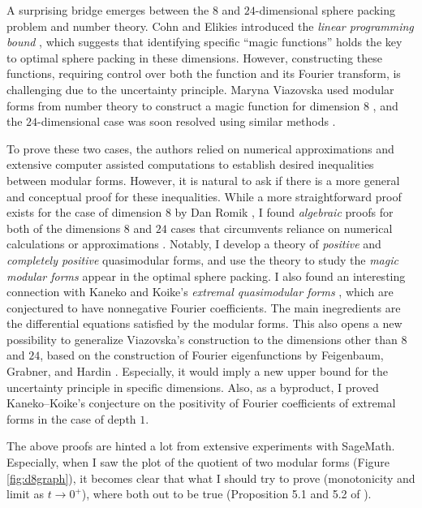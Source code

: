 \documentclass[12pt]{article}
\begin{document}
A surprising bridge emerges between the $8$ and $24$-dimensional sphere packing problem and number theory. 
Cohn and Elikies introduced the \emph{linear programming bound}  \cite{cohn2003new}, which suggests that identifying specific ``magic functions'' holds the key to optimal sphere packing in these dimensions. 
However, constructing these functions, requiring control over both the function and its Fourier transform, is challenging due to the uncertainty principle.
Maryna Viazovska used modular forms from number theory to construct a magic function for dimension $8$ \cite{viazovska2017sphere}, and the $24$-dimensional case was soon resolved using similar methods \cite{cohn2017sphere}.


To prove these two cases, the authors \cite{viazovska2017sphere,cohn2017sphere} relied on numerical approximations and extensive computer assisted computations to establish desired inequalities between modular forms. However, it is natural to ask if there is a more general and conceptual proof for these inequalities.
While a more straightforward proof exists for the case of dimension $8$ by Dan Romik \cite{romik2023viazovska}, I found \emph{algebraic} proofs for both of the dimensions $8$ and $24$ cases that circumvents reliance on numerical calculations or approximations \cite{lee2024algebraic}.
Notably, I develop a theory of \emph{positive} and \emph{completely positive} quasimodular forms, and use the theory to study the \emph{magic modular forms} appear in the optimal sphere packing.
I also found an interesting connection with Kaneko and Koike's \emph{extremal quasimodular forms} \cite{kaneko2006extremal}, which are conjectured to have nonnegative Fourier coefficients.
The main inegredients are the differential equations satisfied by the modular forms.
This also opens a new possibility to generalize Viazovska's construction to the dimensions other than $8$ and $24$, based on the construction of Fourier eigenfunctions by Feigenbaum, Grabner, and Hardin \cite{feigenbaum2021eigenfunctions}.
Especially, it would imply a new upper bound for the uncertainty principle \cite{bourgain2010principe} in specific dimensions.
Also, as a byproduct, I proved Kaneko--Koike's conjecture on the positivity of Fourier coefficients of extremal forms in the case of depth $1$.

The above proofs are hinted a lot from extensive experiments with SageMath.
Especially, when I saw the plot of the quotient of two modular forms (Figure \ref{fig:d8graph}), it becomes clear that what I should try to prove (monotonicity and limit as $t \to 0^+$), where both out to be true (Proposition 5.1 and 5.2 of \cite{lee2024algebraic}).
\end{document}
